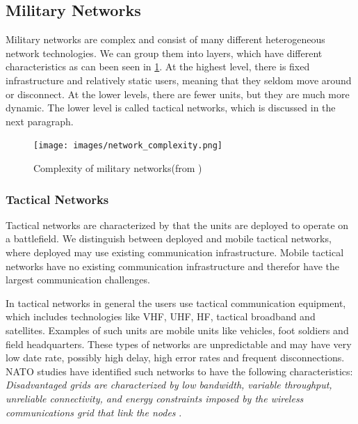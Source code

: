 \subsection{Military Networks}

Military networks are complex and consist of many different heterogeneous
network technologies. We can group them into layers, which have different
characteristics as can been seen in \cref{figure:military-networks}. At the
highest level, there is fixed infrastructure and relatively static users,
meaning that they seldom move around or disconnect. At the lower levels, there
are fewer units, but they are much more dynamic. The lower level is called
tactical networks, which is discussed in the next paragraph.

\begin{figure}[h]
\texttt{[image: images/network\_complexity.png]}
\caption{Complexity of military networks(from \cite{pervasive-web})}
\label{figure:military-networks}
\end{figure}

\subsubsection{Tactical Networks}

Tactical networks are characterized by that the units are deployed to operate on
a battlefield. We distinguish between deployed and mobile tactical networks,
where deployed may use existing communication infrastructure. Mobile tactical
networks have no existing communication infrastructure and therefor have the
largest communication challenges.

 In tactical networks in general the users use tactical communication equipment,
 which includes technologies like VHF, UHF, HF, tactical broadband and
 satellites\cite{ist-090}. Examples of such units are mobile units like
 vehicles, foot soldiers and field headquarters. These types of networks are
 unpredictable and may have very low date rate, possibly high delay, high error
 rates and frequent disconnections.  NATO studies\cite{nato-disadvantaged-grids}
 have identified such networks to have the following characteristics: \\

\textit{
Disadvantaged grids are characterized by low bandwidth, variable throughput,
unreliable connectivity, and energy constraints imposed by the wireless
communications grid that link the nodes
}.

\paragraph{}

